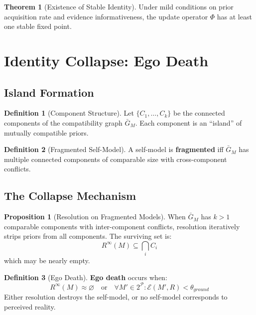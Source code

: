 \documentclass[12pt,a4paper]{article}
\theoremstyle{definition}
\newtheorem{definition}{Definition}[section]
\newtheorem{theorem}{Theorem}[section]
\newtheorem{proposition}{Proposition}[section]
\begin{document}
\begin{theorem}[Existence of Stable Identity]
Under mild conditions on prior acquisition rate and evidence informativeness, the update operator $\Phi$ has at least one stable fixed point.
\end{theorem}

\section{Identity Collapse: Ego Death}

\subsection{Island Formation}

\begin{definition}[Component Structure]
Let $\{C_1, \ldots, C_k\}$ be the connected components of the compatibility graph $\bar{G}_M$. Each component is an ``island'' of mutually compatible priors.
\end{definition}

\begin{definition}[Fragmented Self-Model]
A self-model is \textbf{fragmented} iff $\bar{G}_M$ has multiple connected components of comparable size with cross-component conflicts.
\end{definition}

\subsection{The Collapse Mechanism}

\begin{proposition}[Resolution on Fragmented Models]
When $\bar{G}_M$ has $k > 1$ comparable components with inter-component conflicts, resolution iteratively strips priors from all components. The surviving set is:
\[ R^{\infty}(M) \subseteq \bigcap_i C_i \]
which may be nearly empty.
\end{proposition}

\begin{definition}[Ego Death]
\textbf{Ego death} occurs when:
\[ R^{\infty}(M) \approx \varnothing \quad \text{or} \quad \forall M' \in 2^{\mathcal{P}}: \mathcal{E}(M', R) < \theta_{ground} \]
Either resolution destroys the self-model, or no self-model corresponds to perceived reality.
\end{definition}
\end{document}
